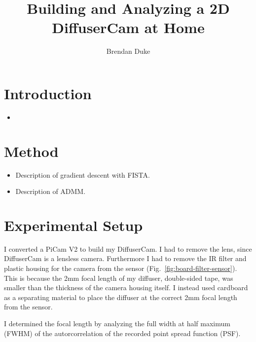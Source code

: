 \documentclass[final]{cvpr}
\begin{document}
\title{Building and Analyzing a 2D DiffuserCam at Home}

\author{Brendan Duke}

\maketitle

\begin{abstract}
\end{abstract}

\section{Introduction}

\begin{itemize}
	\item
\end{itemize}


\section{Method}

\begin{itemize}
	\item Description of gradient descent with FISTA\@.

	\item Description of ADMM\@.
\end{itemize}


\section{Experimental Setup}

I converted a PiCam V2 to build my DiffuserCam.
I had to remove the lens, since DiffuserCam is a lensless camera.
Furthermore I had to remove the IR filter and plastic housing for the camera
from the sensor (Fig.~\ref{fig:board-filter-sensor}).
This is because the 2mm focal length of my diffuser,
double-sided tape, was smaller than the thickness of the camera housing itself.
I instead used cardboard as a separating material to place the diffuser at the
correct 2mm focal length from the sensor.

I determined the focal length by analyzing the full width at half maximum
(FWHM) of the autorcorrelation of the recorded point spread function (PSF).
\end{document}
